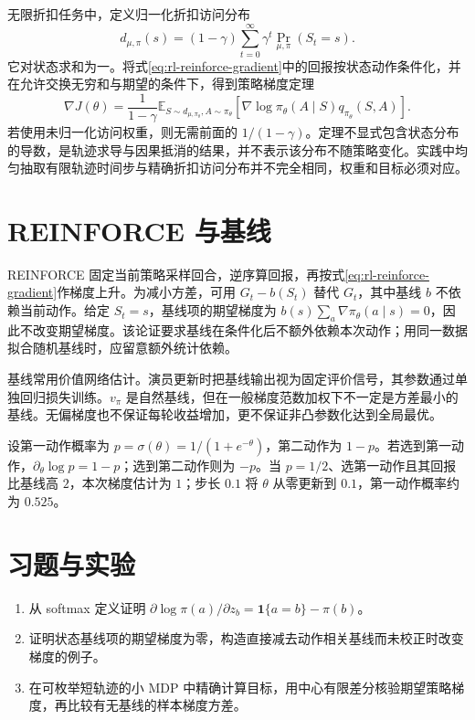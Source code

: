 无限折扣任务中，定义归一化折扣访问分布
\[
d_{\mu,\pi}(s)=(1-\gamma)\sum_{t=0}^\infty\gamma^t\Pr_{\mu,\pi}(S_t=s).
\]
它对状态求和为一。将式\eqref{eq:rl-reinforce-gradient}中的回报按状态动作条件化，并在允许交换无穷和与期望的条件下，得到策略梯度定理
\begin{equation}
\nabla J(\theta)=\frac1{1-\gamma}\mathbb E_{S\sim d_{\mu,\pi_\theta},A\sim\pi_\theta}
\left[\nabla\log\pi_\theta(A\mid S)q_{\pi_\theta}(S,A)\right].
\label{eq:rl-policy-gradient}
\end{equation}
若使用未归一化访问权重，则无需前面的 $1/(1-\gamma)$。定理不显式包含状态分布的导数，是轨迹求导与因果抵消的结果，并不表示该分布不随策略变化。实践中均匀抽取有限轨迹时间步与精确折扣访问分布并不完全相同，权重和目标必须对应。

\section{REINFORCE 与基线}

REINFORCE 固定当前策略采样回合，逆序算回报，再按式\eqref{eq:rl-reinforce-gradient}作梯度上升。为减小方差，可用 $G_t-b(S_t)$ 替代 $G_t$，其中基线 $b$ 不依赖当前动作。给定 $S_t=s$，基线项的期望梯度为 $b(s)\sum_a\nabla\pi_\theta(a\mid s)=0$，因此不改变期望梯度。该论证要求基线在条件化后不额外依赖本次动作；用同一数据拟合随机基线时，应留意额外统计依赖。

基线常用价值网络估计。演员更新时把基线输出视为固定评价信号，其参数通过单独回归损失训练。$v_\pi$ 是自然基线，但在一般梯度范数加权下不一定是方差最小的基线。无偏梯度也不保证每轮收益增加，更不保证非凸参数化达到全局最优。

\begin{example}[双动作策略的一次更新]
设第一动作概率为 $p=\sigma(\theta)=1/(1+e^{-\theta})$，第二动作为 $1-p$。若选到第一动作，$\partial_\theta\log p=1-p$；选到第二动作则为 $-p$。当 $p=1/2$、选第一动作且其回报比基线高 $2$，本次梯度估计为 $1$；步长 $0.1$ 将 $\theta$ 从零更新到 $0.1$，第一动作概率约为 $0.525$。
\end{example}

\section{习题与实验}
\begin{enumerate}
\item 从 softmax 定义证明 $\partial\log\pi(a)/\partial z_b=\mathbf1\{a=b\}-\pi(b)$。
\item 证明状态基线项的期望梯度为零，构造直接减去动作相关基线而未校正时改变梯度的例子。
\item 在可枚举短轨迹的小 MDP 中精确计算目标，用中心有限差分核验期望策略梯度，再比较有无基线的样本梯度方差。
\end{enumerate}





